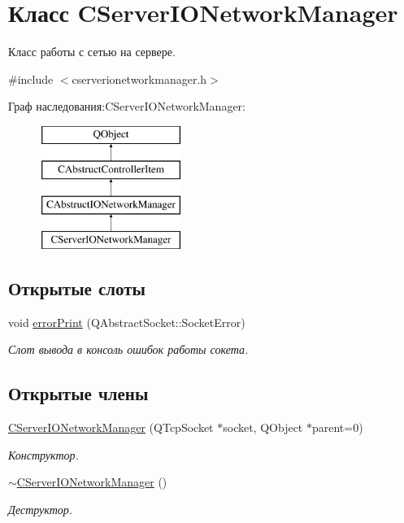 \hypertarget{class_c_server_i_o_network_manager}{}\section{Класс C\+Server\+I\+O\+Network\+Manager}
\label{class_c_server_i_o_network_manager}


Класс работы с сетью на сервере.  




{\ttfamily \#include $<$cserverionetworkmanager.\+h$>$}

Граф наследования\+:C\+Server\+I\+O\+Network\+Manager\+:\begin{figure}[H]
\begin{center}
\leavevmode
\includegraphics[height=4.000000cm]{class_c_server_i_o_network_manager}
\end{center}
\end{figure}
\subsection*{Открытые слоты}
\begin{DoxyCompactItemize}
\item 
void \hyperlink{class_c_server_i_o_network_manager_a27831f1d8f66c1e0d665c2ef52d262e4}{error\+Print} (Q\+Abstract\+Socket\+::\+Socket\+Error)
\begin{DoxyCompactList}\small\item\em Слот вывода в консоль ошибок работы сокета. \end{DoxyCompactList}\end{DoxyCompactItemize}
\subsection*{Открытые члены}
\begin{DoxyCompactItemize}
\item 
\hyperlink{class_c_server_i_o_network_manager_a89afb0912a02b5745aaad5ccea706304}{C\+Server\+I\+O\+Network\+Manager} (Q\+Tcp\+Socket $\ast$socket, Q\+Object $\ast$parent=0)
\begin{DoxyCompactList}\small\item\em Конструктор. \end{DoxyCompactList}\item 
\hyperlink{class_c_server_i_o_network_manager_a513fe280d83eab4b89054eac2fb27e0d}{$\sim$\+C\+Server\+I\+O\+Network\+Manager} ()
\begin{DoxyCompactList}\small\item\em Деструктор. \end{DoxyCompactList}\end{DoxyCompactItemize}
